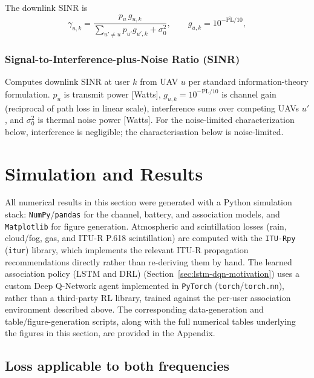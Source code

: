\documentclass[conference]{IEEEtran}
\begin{document}
The downlink SINR is
\begin{equation}
\gamma_{u,k} = \frac{p_u\,g_{u,k}}{\sum_{u'\neq u} p_{u'} g_{u',k} + \sigma_0^2},
\qquad g_{u,k}=10^{-\overline{\mathrm{PL}}/10},
\label{eq:sinr}
\end{equation}

\subsubsection{Signal-to-Interference-plus-Noise Ratio (SINR)}
Computes downlink SINR at user $k$ from UAV $u$ per standard information-theory formulation. $p_u$ is transmit power [Watts], $g_{u,k}=10^{-\overline{\mathrm{PL}}/10}$ is channel gain (reciprocal of path loss in linear scale), interference sums over competing UAVs $u'$, and $\sigma_0^2$ is thermal noise power [Watts]. For the noise-limited characterization below, interference is negligible; the characterisation below is
noise-limited.

\section{Simulation and Results}

All numerical results in this section were generated with a Python simulation
stack: \texttt{NumPy}/\texttt{pandas} for the channel, battery, and association
models, and \texttt{Matplotlib} for figure generation. Atmospheric and
scintillation losses (rain, cloud/fog, gas, and ITU-R P.618 scintillation) are
computed with the \texttt{ITU-Rpy} (\texttt{itur}) library, which implements the
relevant ITU-R propagation recommendations directly rather than re-deriving
them by hand. The learned association policy (LSTM and DRL) (Section~\ref{sec:lstm-dqn-motivation})
uses a custom Deep Q-Network agent implemented in \texttt{PyTorch}
(\texttt{torch}/\texttt{torch.nn}), rather than a third-party RL library, trained
against the per-user association environment described above. The corresponding
data-generation and table/figure-generation scripts, along with the full
numerical tables underlying the figures in this section, are provided in the
Appendix.

\subsection{Loss applicable to both frequencies}
\end{document}
